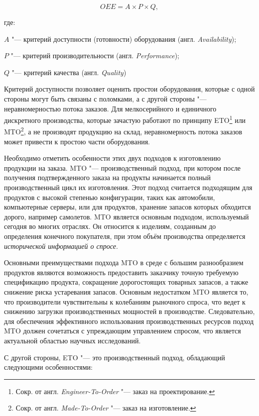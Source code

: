 \begin{equation}
OEE = A \times P \times Q,
\label{eq:oee}
\end{equation} 

\noindent где:

\noindent $A$ "--- критерий доступности (готовности) оборудования (англ. \textit{Availability});

\noindent $P$ "--- критерий производительности (англ. \textit{Performance});

\noindent $Q$ "--- критерий качества (англ. \textit{Quality})

Критерий доступности позволяет оценить простои оборудования, которые с одной стороны могут быть связаны с поломками, а с другой стороны "--- неравномерностью потока заказов. Для мелкосерийного и единичного дискретного производства, которые зачастую работают по принципу ETO\footnote{Сокр. от англ. \textit{Engineer-To-Order} "--- заказ на проектирование.} или MTO\footnote{Сокр. от англ. \textit{Made-To-Order} "--- заказ на изготовление.}, а не производят продукцию на склад, неравномерность потока заказов может привести к простою части оборудования.

Необходимо отметить особенности этих двух подходов к изготовлению продукции на заказа. MTO "--- производственный подход, при котором после получения подтвержденного заказа на продукты начинается полный производственный цикл их изготовления. Этот подход считается подходящим для продуктов с высокой степенью конфигурации, таких как автомобили, компьютерные серверы, или для продуктов, хранение запасов которых обходится дорого, например самолетов. MTO является основным подходом, используемый сегодня во многих отраслях. Он относится к изделиям, созданным до определения конечного покупателя, при этом объём производства определяется \textit{исторической информацией о спросе}.

Основными преимуществами подхода MTO в среде с большим разнообразием продуктов являются возможность предоставить заказчику точную требуемую спецификацию продукта, сокращение дорогостоящих товарных запасов, а также снижение риска устаревания запасов.
Основным недостатком MTO является то, что производители чувствительны к колебаниям рыночного спроса, что ведет к снижению загрузки производственных мощностей в производстве. Следовательно, для обеспечения эффективного использования производственных ресурсов подход MTO должен сочетаться с упреждающим управлением спросом, что является актуальной областью научных исследований.

С другой стороны, ETO "--- это производственный подход, обладающий следующими особенностями:


